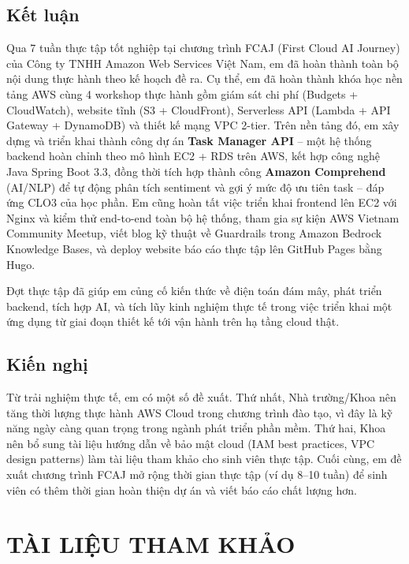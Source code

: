 \documentclass[13pt]{extarticle}
\begin{document}
\subsection{Kết luận}

Qua 7 tuần thực tập tốt nghiệp tại chương trình FCAJ (First Cloud AI Journey)
của Công ty TNHH Amazon Web Services Việt Nam, em đã hoàn thành toàn bộ nội
dung thực hành theo kế hoạch đề ra. Cụ thể, em đã hoàn thành khóa học nền
tảng AWS cùng 4 workshop thực hành gồm giám sát chi phí (Budgets +
CloudWatch), website tĩnh (S3 + CloudFront), Serverless API (Lambda + API
Gateway + DynamoDB) và thiết kế mạng VPC 2-tier. Trên nền tảng đó, em xây
dựng và triển khai thành công dự án \textbf{Task Manager API} -- một hệ
thống backend hoàn chỉnh theo mô hình EC2 + RDS trên AWS, kết hợp công nghệ
Java Spring Boot 3.3, đồng thời tích hợp thành công \textbf{Amazon
Comprehend} (AI/NLP) để tự động phân tích sentiment và gợi ý mức độ ưu tiên
task -- đáp ứng CLO3 của học phần. Em cũng hoàn tất việc triển khai frontend
lên EC2 với Nginx và kiểm thử end-to-end toàn bộ hệ thống, tham gia sự kiện
AWS Vietnam Community Meetup, viết blog kỹ thuật về Guardrails trong Amazon
Bedrock Knowledge Bases, và deploy website báo cáo thực tập lên GitHub Pages
bằng Hugo.

Đợt thực tập đã giúp em củng cố kiến thức về điện toán đám mây, phát triển
backend, tích hợp AI, và tích lũy kinh nghiệm thực tế trong việc triển khai
một ứng dụng từ giai đoạn thiết kế tới vận hành trên hạ tầng cloud thật.

\subsection{Kiến nghị}

Từ trải nghiệm thực tế, em có một số đề xuất. Thứ nhất, Nhà trường/Khoa nên
tăng thời lượng thực hành AWS Cloud trong chương trình đào tạo, vì đây là kỹ
năng ngày càng quan trọng trong ngành phát triển phần mềm. Thứ hai, Khoa nên
bổ sung tài liệu hướng dẫn về bảo mật cloud (IAM best practices, VPC design
patterns) làm tài liệu tham khảo cho sinh viên thực tập. Cuối cùng, em đề
xuất chương trình FCAJ mở rộng thời gian thực tập (ví dụ 8--10 tuần) để sinh
viên có thêm thời gian hoàn thiện dự án và viết báo cáo chất lượng hơn.

\newpage

\section*{TÀI LIỆU THAM KHẢO}
\end{document}
